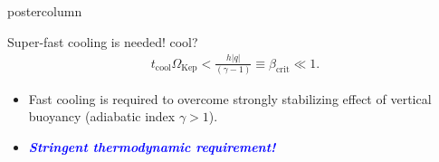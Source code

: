 \documentclass[final,hyperref={pdfpagelabels=false}]{beamer}
\begin{document}
\begin{frame}
\begin{columns}
\begin{column}{.49\textwidth}
\begin{beamercolorbox}[center,wd=\textwidth]{postercolumn}
\begin{minipage}[T]{.95\textwidth}
{\begin{block}{{\Large Super-fast cooling is needed!}}
{{{                  cool?}}}
            \begin{align}
               t_\mathrm{cool}\Omega_\mathrm{Kep} < \frac{h |q|}{(\gamma -
                1)} \equiv \beta_\mathrm{crit}\ll 1.   
            \end{align}
            \begin{itemize}
            \item Fast cooling is required to overcome strongly
              stabilizing effect of vertical buoyancy (adiabatic index
              $\gamma>1$).
            \item \textcolor{blue}{\emph{\bf{Stringent thermodynamic
                    requirement!}}}            \end{itemize} 
            \end{block}
            \vfill
            
}
\end{minipage}
\end{beamercolorbox}
\end{column}
\end{columns}
\end{frame}
\end{document}
